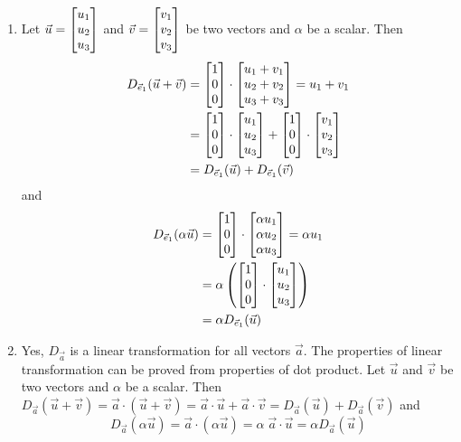 \begin{exercises}
\begin{problist}
\begin{solution}
\begin{enumerate}
				\item Let $\vec{u}= \mat{u_1\\u_2\\u_3}$ and
					$\vec{v}= \mat{v_1 \\ v_2\\v_3}$ be two vectors and $\alpha$
					be a scalar. Then
					\begin{align*}
						D_{\vec{e}_1}(\vec{u}+ \vec{v}) & = \mat{1\\0\\0}\cdot \mat{u_1 + v_1 \\ u_2 + v_2 \\ u_3+v_3}= u_{1}+ v_{1}           \\
						                                & = \mat{1\\0\\0}\cdot \mat{u_1 \\ u_2\\u_3}+ \mat{1\\0\\0}\cdot \mat{v_1 \\ v_2\\v_3} \\
						                                & = D_{\vec{e}_1}(\vec{u}) + D_{\vec{e}_1}(\vec{v})
					\end{align*} and
					\begin{align*}
						D_{\vec{e}_1}(\alpha \vec{u}) & = \mat{1\\0\\0}\cdot \mat{\alpha u_1 \\ \alpha u_2\\ \alpha u_3}= \alpha u_{1} \\
						                              & = \alpha \left( \mat{1\\0\\0}\cdot \mat{u_1 \\ u_2\\u_3}\right )               \\
						                              & = \alpha D_{\vec{e}_1}(\vec{u})
					\end{align*}

				\item Yes, $D_{\vec{a}}$ is a linear transformation for all vectors
					$\vec{a}$. The properties of linear transformation can be
					proved from properties of dot product. Let $\vec{u}$ and $\vec
					{v}$ be two vectors and $\alpha$ be a scalar. Then
					$D_{\vec{a}}(\vec{u}+ \vec{v})= \vec{a}\cdot (\vec{u}+ \vec
					{v}) = \vec{a}\cdot \vec{u}+ \vec{a}\cdot \vec{v}= D
					_{\vec{a}}(\vec{u}) + D_{\vec{a}}(\vec{v})$
					and
					\[
						 D_{\vec{a}}(\alpha \vec{u}) = \vec{a}\cdot ( \alpha \vec
						{u}) = \alpha \; \vec{a}\cdot \vec{u}= \alpha D_{\vec{a}}
						(\vec{u})
					\]


\end{enumerate}
\end{solution}
\end{problist}
\end{exercises}
